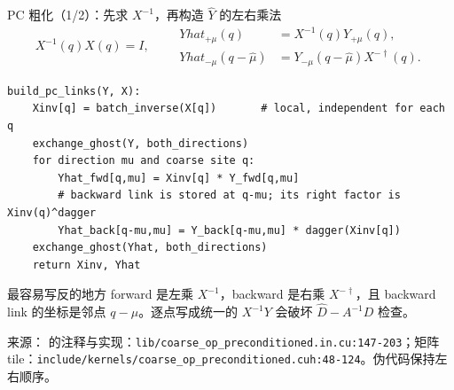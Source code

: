 \documentclass[UTF8,aspectratio=169,11pt]{ctexbeamer}
\newcommand{\source}[1]{\vspace{0.05em}\par{\raggedright\scriptsize\color{muted}来源：#1\par}}
\newcommand{\codepath}[1]{\nolinkurl{#1}}
\begin{document}
\begin{frame}[fragile,t]{PC 粗化（1/2）：先求 \(X^{-1}\)，再构造 \(\widehat Y\) 的左右乘法}
  \begin{equation*}
    X^{-1}(q)X(q)=I,
    \qquad
    \begin{aligned}
      Yhat_{+\mu}(q)&=X^{-1}(q)Y_{+\mu}(q),\\
      Yhat_{-\mu}(q-\hat\mu)&=Y_{-\mu}(q-\hat\mu)X^{-\dagger}(q).
    \end{aligned}
  \end{equation*}
  \begin{lstlisting}[firstnumber=1]
build_pc_links(Y, X):
    Xinv[q] = batch_inverse(X[q])       # local, independent for each q
    exchange_ghost(Y, both_directions)
    for direction mu and coarse site q:
        Yhat_fwd[q,mu] = Xinv[q] * Y_fwd[q,mu]
        # backward link is stored at q-mu; its right factor is Xinv(q)^dagger
        Yhat_back[q-mu,mu] = Y_back[q-mu,mu] * dagger(Xinv[q])
    exchange_ghost(Yhat, both_directions)
    return Xinv, Yhat
  \end{lstlisting}
  \vspace{0.07cm}
  \begin{alertblock}{最容易写反的地方}
    forward 是左乘 \(X^{-1}\)，backward 是右乘 \(X^{-\dagger}\)，且 backward link 的坐标是邻点 \(q-\mu\)。逐点写成统一的 \(X^{-1}Y\) 会破坏 \(\hat D-A^{-1}D\) 检查。
  \end{alertblock}
  \source{\texttt{} 的注释与实现：\codepath{lib/coarse_op_preconditioned.in.cu:147-203}；矩阵 tile：\codepath{include/kernels/coarse_op_preconditioned.cuh:48-124}。伪代码保持左右顺序。}
\end{frame}
\end{document}
